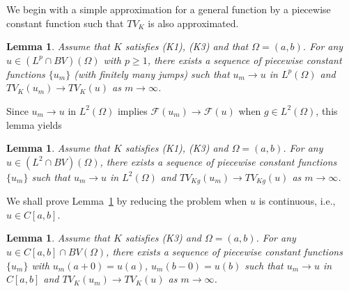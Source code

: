 \documentclass[12pt, reqno]{amsart}
\numberwithin{equation}{section}
\newtheorem{lemma}[thm]{Lemma}
\begin{document}
We begin with a simple approximation for a general function by a piecewise constant function such that $TV_K$ is also approximated.
\begin{lemma} \label{LAp1}
Assume that $K$ satisfies (K1), (K3) and that $\Omega=(a,b)$.
 For any $u\in(L^p\cap BV)(\Omega)$ with $p\geq1$, there exists a sequence of piecewise constant functions $\{u_m\}$ (with finitely many jumps) such that $u_m\to u$ in $L^p(\Omega)$ and $TV_K(u_m)\to TV_K(u)$ as $m\to\infty$.
\end{lemma}
Since $u_m\to u$ in $L^2(\Omega)$ implies $\mathcal{F}(u_m)\to\mathcal{F}(u)$ when $g\in L^2(\Omega)$, this lemma yields
\begin{lemma} \label{LAp2}
Assume that $K$ satisfies (K1), (K3) and $\Omega=(a,b)$.
 For any $u\in(L^2\cap BV)(\Omega)$, there exists a sequence of piecewise constant functions $\{u_m\}$ such that $u_m\to u$ in $L^2(\Omega)$ and $TV_{Kg}(u_m)\to TV_{Kg}(u)$ as $m\to\infty$.
\end{lemma}
We shall prove Lemma~\ref{LAp1} by reducing the problem when $u$ is continuous, i.e., $u\in C[a,b]$.
\begin{lemma} \label{LApC}
Assume that $K$ satisfies (K3) and $\Omega=(a,b)$.
 For any $u\in C[a,b]\cap BV(\Omega)$, there exists a sequence of piecewise constant functions $\{u_m\}$ with $u_m(a+0)=u(a)$, $u_m(b-0)=u(b)$ such that $u_m\to u$ in $C[a,b]$ and $TV_K(u_m)\to TV_K(u)$ as $m\to\infty$.
\end{lemma}
%
\end{document}
